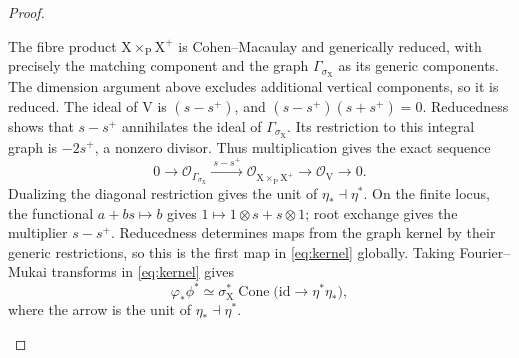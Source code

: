 \documentclass[a4paper,10pt]{article}
\newcommand{\X}{\mathrm{X}}
\newcommand{\V}{\mathrm{V}}
\newcommand{\Pj}{\mathrm{P}}
\newcommand{\OO}{\mathcal O}
\newcommand{\id}{\mathrm{id}}
\newcommand{\Cone}{\operatorname{Cone}}
\theoremstyle{remark}
\theoremstyle{plain}
\begin{document}
\begin{proof}
\begin{enumerate}
The fibre product $\X\times_\Pj\X^+$ is Cohen--Macaulay and generically
reduced, with precisely the matching component and the graph
$\Gamma_{\sigma_\X}$ as its generic components. The dimension argument
above excludes additional vertical components, so it is reduced.
The ideal of $\V$ is $(s-s^+)$, and
$(s-s^+)(s+s^+)=0$. Reducedness shows that $s-s^+$ annihilates the
ideal of $\Gamma_{\sigma_\X}$. Its restriction to this integral graph
is $-2s^+$, a nonzero divisor. Thus multiplication gives the exact sequence
\begin{equation}\label{eq:kernel}
0\longrightarrow\OO_{\Gamma_{\sigma_\X}}
\xrightarrow{\ s-s^+\ }
\OO_{\X\times_\Pj\X^+}
\longrightarrow\OO_\V\longrightarrow0.
\end{equation}
Dualizing the diagonal restriction gives the unit of $\eta_*\dashv\eta^*$.
On the finite locus, the functional $a+bs\mapsto b$ gives
$1\mapsto1\otimes s+s\otimes1$; root exchange gives the multiplier
$s-s^+$. Reducedness determines maps from the graph kernel by their
generic restrictions, so this is the first map in \eqref{eq:kernel} globally.
Taking Fourier--Mukai transforms in \eqref{eq:kernel} gives
\begin{equation}\label{eq:unit-cone}
\varphi_*\phi^*
\simeq\sigma_\X^*\Cone\bigl(
\id\longrightarrow \eta^*\eta_*\bigr),
\end{equation}
where the arrow is the unit of $\eta_*\dashv \eta^*$.


\end{enumerate}
\end{proof}
\end{document}
